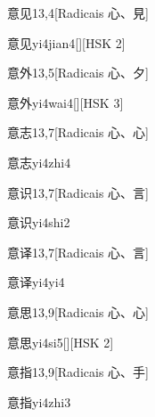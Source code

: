 \begin{entry}{意见}{13,4}[Radicais ⼼、⾒]
  \begin{phonetics}{意见}{yi4jian4}[][HSK 2]
  \end{phonetics}
\end{entry}

\begin{entry}{意外}{13,5}[Radicais ⼼、⼣]
  \begin{phonetics}{意外}{yi4wai4}[][HSK 3]
  \end{phonetics}
\end{entry}

\begin{entry}{意志}{13,7}[Radicais ⼼、⼼]
  \begin{phonetics}{意志}{yi4zhi4}
  \end{phonetics}
\end{entry}

\begin{entry}{意识}{13,7}[Radicais ⼼、⾔]
  \begin{phonetics}{意识}{yi4shi2}
  \end{phonetics}
\end{entry}

\begin{entry}{意译}{13,7}[Radicais ⼼、⾔]
  \begin{phonetics}{意译}{yi4yi4}
  \end{phonetics}
\end{entry}

\begin{entry}{意思}{13,9}[Radicais ⼼、⼼]
  \begin{phonetics}{意思}{yi4si5}[][HSK 2]
  \end{phonetics}
\end{entry}

\begin{entry}{意指}{13,9}[Radicais ⼼、⼿]
  \begin{phonetics}{意指}{yi4zhi3}
  \end{phonetics}
\end{entry}

